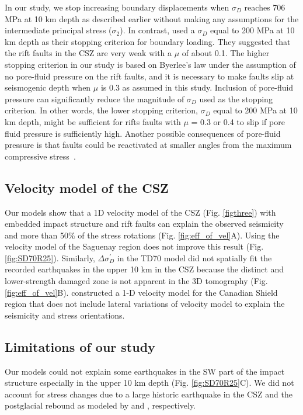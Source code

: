 \documentclass[draft]{agujournal2018}
\begin{document}
In our study, we stop increasing boundary displacements when $\sigma_{D}$ reaches 706 MPa at 10 km depth as described earlier without making any assumptions for the intermediate principal stress ($\sigma_2$). In contrast, \citet{Baird_2010} used a $\sigma_{D}$ equal to 200 MPa at 10 km depth as their stopping criterion for boundary loading. They suggested that the rift faults in the CSZ are very weak with a $\mu$ of about 0.1. The higher stopping criterion in our study is based on Byerlee's law under the assumption of no pore-fluid pressure on the rift faults, and it is necessary to make faults slip at seismogenic depth when $\mu$ is 0.3 as assumed in this study. Inclusion of pore-fluid pressure can significantly reduce the magnitude of $\sigma_{D}$ used as the stopping criterion. In other words, the lower stopping criterion, $\sigma_{D}$ equal to 200 MPa at 10 km depth, might be sufficient for rifts faults with $\mu$ = 0.3 or 0.4 to slip if pore fluid pressure is sufficiently high. Another possible consequences of pore-fluid pressure is that faults could be reactivated at smaller angles from the maximum compressive stress~\citep[e.g.,][]{ChenChen18}.

\subsection{Velocity model of the CSZ}
Our models show that a 1D velocity model of the CSZ \citep{lamontagne1999} (Fig. \ref{figthree}) with embedded impact structure and rift faults can explain the observed seismicity and more than 50$\%$ of the stress rotations (Fig. \ref{fig:eff_of_vel}A). Using the velocity model of the Saguenay region does not improve this result (Fig. \ref{fig:SD70R25}). Similarly, $\Delta\sigma_{D}^\prime$ in the TD70 model did not spatially fit the recorded earthquakes in the upper 10 km in the CSZ because the distinct and lower-strength damaged zone is not apparent in the 3D tomography \citep{Powell_2017} (Fig. \ref{fig:eff_of_vel}B). \citet{lamontagne1999} constructed a 1-D velocity model for the Canadian Shield region that does not include lateral variations of velocity model to explain the seismicity and stress orientations.

\subsection{Limitations of our study}
Our models could not explain some earthquakes in the SW part of the impact structure especially in the upper 10 km depth (Fig. \ref{fig:SD70R25}C). We did not account for stress changes due to a large historic earthquake in the CSZ and the postglacial rebound as modeled by \citet{Fereidoni2014} and \citet{Mazzotti_GPS2005}, respectively.
\end{document}
